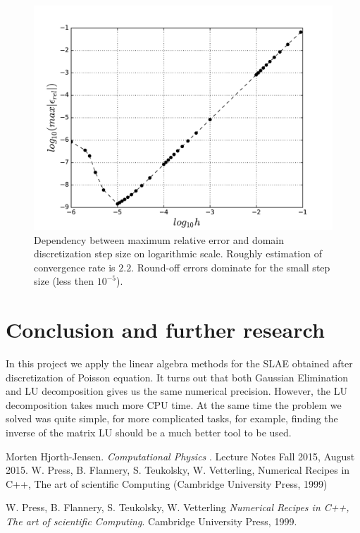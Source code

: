 \documentclass[10pt]{article}
\begin{document}
\begin{figure}
  \begin{center}
    \includegraphics[scale=0.7]{relative_error_log}
    \caption{Dependency between maximum relative error and domain discretization step size on logarithmic scale. Roughly estimation of convergence rate is $2.2$. Round-off errors dominate for the small step size (less then $10^{-5}$).}
    \label{fig:error}
  \end{center}
\end{figure}
\newpage
\section{Conclusion and further research}
In this project we apply the linear algebra methods for the SLAE obtained after discretization of Poisson equation. It turns out that both Gaussian Elimination and LU decomposition gives us the same numerical precision. However, the LU decomposition takes much more CPU time. At the same time the problem we solved was quite simple, for more complicated tasks, for example, finding the inverse of the matrix LU should be a much better tool to be used.

\newpage
\begin{thebibliography}{2}
Morten Hjorth-Jensen. 
\textit{Computational Physics
}. 
Lecture Notes Fall 2015, August 2015.
 W. Press, B. Flannery, S. Teukolsky, W. Vetterling, Numerical Recipes in C++, The art of scientific Computing (Cambridge University Press, 1999)

W. Press, B. Flannery, S. Teukolsky, W. Vetterling 
\textit{Numerical Recipes in C++, The art of scientific Computing}. 
Cambridge University Press, 1999.
 
\end{thebibliography}
\end{document}
